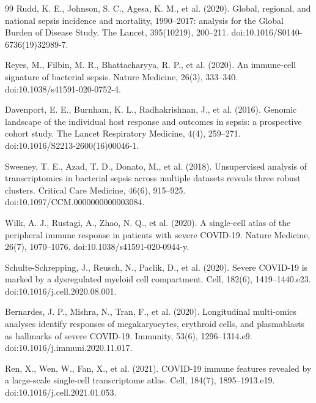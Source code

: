 \documentclass[11pt,a4paper]{article}
\begin{document}
\begin{thebibliography}{99}
Rudd, K. E., Johnson, S. C., Agesa, K. M., et al. (2020).
\newblock Global, regional, and national sepsis incidence and mortality, 1990--2017: analysis for the Global Burden of Disease Study.
\newblock The Lancet, 395(10219), 200--211. doi:10.1016/S0140-6736(19)32989-7.

Reyes, M., Filbin, M. R., Bhattacharyya, R. P., et al. (2020).
\newblock An immune-cell signature of bacterial sepsis.
\newblock Nature Medicine, 26(3), 333--340. doi:10.1038/s41591-020-0752-4.

Davenport, E. E., Burnham, K. L., Radhakrishnan, J., et al. (2016).
\newblock Genomic landscape of the individual host response and outcomes in sepsis: a prospective cohort study.
\newblock The Lancet Respiratory Medicine, 4(4), 259--271. doi:10.1016/S2213-2600(16)00046-1.

Sweeney, T. E., Azad, T. D., Donato, M., et al. (2018).
\newblock Unsupervised analysis of transcriptomics in bacterial sepsis across multiple datasets reveals three robust clusters.
\newblock Critical Care Medicine, 46(6), 915--925. doi:10.1097/CCM.0000000000003084.

Wilk, A. J., Rustagi, A., Zhao, N. Q., et al. (2020).
\newblock A single-cell atlas of the peripheral immune response in patients with severe COVID-19.
\newblock Nature Medicine, 26(7), 1070--1076. doi:10.1038/s41591-020-0944-y.

Schulte-Schrepping, J., Reusch, N., Paclik, D., et al. (2020).
\newblock Severe COVID-19 is marked by a dysregulated myeloid cell compartment.
\newblock Cell, 182(6), 1419--1440.e23. doi:10.1016/j.cell.2020.08.001.

Bernardes, J. P., Mishra, N., Tran, F., et al. (2020).
\newblock Longitudinal multi-omics analyses identify responses of megakaryocytes, erythroid cells, and plasmablasts as hallmarks of severe COVID-19.
\newblock Immunity, 53(6), 1296--1314.e9. doi:10.1016/j.immuni.2020.11.017.

Ren, X., Wen, W., Fan, X., et al. (2021).
\newblock COVID-19 immune features revealed by a large-scale single-cell transcriptome atlas.
\newblock Cell, 184(7), 1895--1913.e19. doi:10.1016/j.cell.2021.01.053.


\end{thebibliography}
\end{document}
